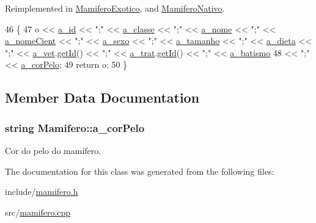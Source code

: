 Reimplemented in \hyperlink{classMamiferoExotico_a465d48bc4a1111059ec38a04f76b264e}{Mamifero\+Exotico}, and \hyperlink{classMamiferoNativo_a0116235f807fb5a15ace63321d62518d}{Mamifero\+Nativo}.


\begin{DoxyCode}
46 \{
47     o << \hyperlink{classAnimal_a1eab12d1133a739dc0fea720cf6cc927}{a\_id} << \textcolor{stringliteral}{";"} << \hyperlink{classAnimal_a1f32b4455559489b5f5dce71913a6f8f}{a\_classe} << \textcolor{stringliteral}{";"} << \hyperlink{classAnimal_ad815bbe345d7c5274858ac8ccb24bc52}{a\_nome} << \textcolor{stringliteral}{";"} << 
      \hyperlink{classAnimal_af2ae0fc23b0eaf3edaee4579f6199dfc}{a\_nomeCient} << \textcolor{stringliteral}{";"} << \hyperlink{classAnimal_af2b1c520d145f82af7a5a88bb4271a0d}{a\_sexo} << \textcolor{stringliteral}{";"} << \hyperlink{classAnimal_a72366b060dfdbc0dd074fbe41decfcc2}{a\_tamanho} << \textcolor{stringliteral}{";"} << 
      \hyperlink{classAnimal_a32088524517a531af269e3ec04275135}{a\_dieta} << \textcolor{stringliteral}{";"} << \hyperlink{classAnimal_a12ce5681957e27dae674cbbde7fb1e4f}{a\_vet}.\hyperlink{classFuncionario_a0288286a907e587b7ab75d6c23354a06}{getId}() << \textcolor{stringliteral}{";"} << \hyperlink{classAnimal_a19fbf607b29b06a86f598dd1ffb8c712}{a\_trat}.\hyperlink{classFuncionario_a0288286a907e587b7ab75d6c23354a06}{getId}() << \textcolor{stringliteral}{";"} << 
      \hyperlink{classAnimal_a4e308163c5b3d82e546fb39b399bcb71}{a\_batismo}
48     << \textcolor{stringliteral}{";"} << \hyperlink{classMamifero_a7fed480798de8d55d17b3fd8cfdb24fb}{a\_corPelo};
49     \textcolor{keywordflow}{return} o;
50 \}
\end{DoxyCode}


\subsection{Member Data Documentation}
\subsubsection[{\texorpdfstring{a\+\_\+cor\+Pelo}{a_corPelo}}]{\setlength{\rightskip}{0pt plus 5cm}string Mamifero\+::a\+\_\+cor\+Pelo\hspace{0.3cm}{\ttfamily [protected]}}\hypertarget{classMamifero_a7fed480798de8d55d17b3fd8cfdb24fb}{}\label{classMamifero_a7fed480798de8d55d17b3fd8cfdb24fb}


Cor do pelo do mamífero. 



The documentation for this class was generated from the following files\+:\begin{DoxyCompactItemize}
\item 
include/\hyperlink{mamifero_8h}{mamifero.\+h}\item 
src/\hyperlink{mamifero_8cpp}{mamifero.\+cpp}\end{DoxyCompactItemize}

